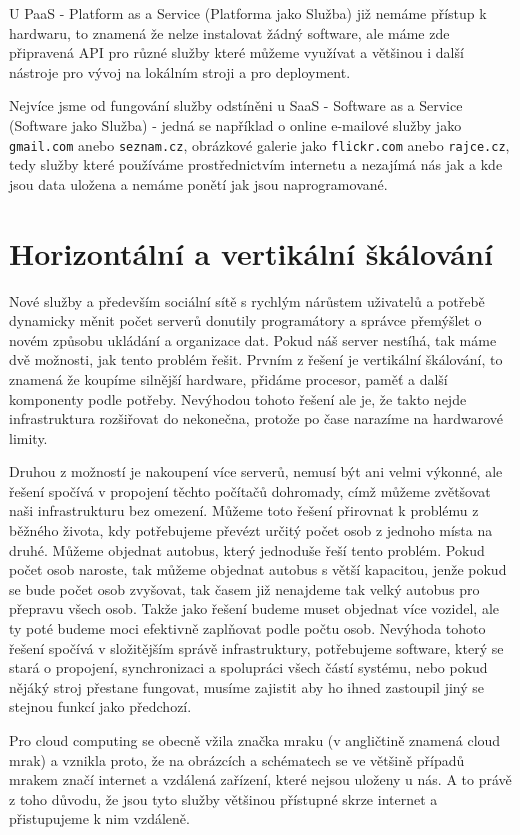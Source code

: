 U PaaS - Platform as a Service  (Platforma jako Služba) již nemáme přístup k hardwaru, to znamená že nelze instalovat žádný software, ale máme zde připravená API pro různé služby které můžeme využívat a většinou i další nástroje pro vývoj na lokálním stroji a pro deployment.

Nejvíce jsme od fungování služby odstíněni u SaaS - Software as a Service (Software jako Služba) - jedná se například o online e-mailové služby jako \verb|gmail.com| anebo \verb|seznam.cz|, obrázkové galerie jako \verb|flickr.com| anebo \verb|rajce.cz|, tedy služby které používáme prostřednictvím internetu a nezajímá nás jak a kde jsou data uložena a nemáme ponětí jak jsou naprogramované.

\section{Horizontální a vertikální škálování}
Nové služby a především sociální sítě s rychlým nárůstem uživatelů a potřebě dynamicky měnit počet serverů donutily programátory a správce přemýšlet o novém způsobu ukládání a organizace dat. Pokud náš server nestíhá, tak máme dvě možnosti, jak tento problém řešit. Prvním z řešení je vertikální škálování, to znamená že koupíme silnější hardware, přidáme procesor, paměť a další komponenty podle potřeby. Nevýhodou tohoto řešení ale je, že takto nejde infrastruktura rozšiřovat do nekonečna, protože po čase narazíme na hardwarové limity. 

Druhou z možností je nakoupení více serverů, nemusí být ani velmi výkonné, ale řešení spočívá v propojení těchto počítačů dohromady, címž můžeme zvětšovat naši infrastrukturu bez omezení. Můžeme toto řešení přirovnat k problému z běžného života, kdy potřebujeme převézt určitý počet osob z jednoho místa na druhé. Můžeme objednat autobus, který jednoduše řeší tento problém. Pokud počet osob naroste, tak můžeme objednat autobus s větší kapacitou, jenže pokud se bude počet osob zvyšovat, tak časem již nenajdeme tak velký autobus pro přepravu všech osob. Takže jako řešení budeme muset objednat více vozidel, ale ty poté budeme moci efektivně zaplňovat podle počtu osob. Nevýhoda tohoto řešení spočívá v složitějším správě infrastruktury, potřebujeme software, který se stará o propojení, synchronizaci a spolupráci všech částí systému, nebo pokud nějáký stroj přestane fungovat, musíme zajistit aby ho ihned zastoupil jiný se stejnou funkcí jako předchozí.

Pro cloud computing se obecně vžila značka mraku (v angličtině znamená cloud mrak) a vznikla proto, že na obrázcích a schématech se ve většině případů mrakem značí internet a vzdálená zařízení, které nejsou uloženy u nás. A to právě z toho důvodu, že jsou tyto služby většinou přístupné skrze internet a přistupujeme k nim vzdáleně.

